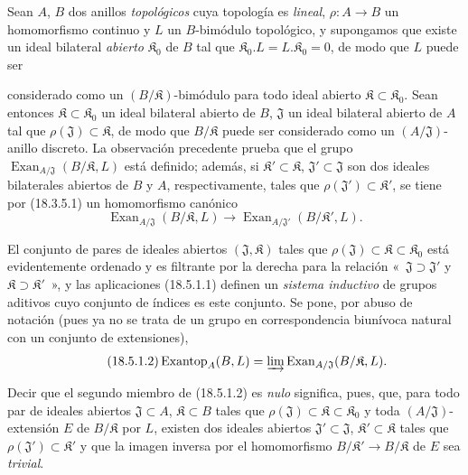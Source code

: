 \begin{env}[18.5.1]
\label{0.18.5.1-es}
Sean $A$, $B$ dos anillos \emph{topológicos} cuya topología es \emph{lineal},
$\rho:A\to B$ un homomorfismo continuo y $L$ un $B$-bimódulo topológico, y
supongamos que existe un ideal bilateral \emph{abierto} $\mathfrak K_0$ de $B$
tal que $\mathfrak K_0.L=L.\mathfrak K_0=0$, de modo que $L$ puede ser


considerado como un $(B/\mathfrak K)$-bimódulo para todo ideal abierto
$\mathfrak K\subset\mathfrak K_0$. Sean entonces
$\mathfrak K\subset\mathfrak K_0$ un ideal bilateral abierto de $B$,
$\mathfrak J$ un ideal bilateral abierto de $A$ tal que
$\rho(\mathfrak J)\subset\mathfrak K$, de modo que $B/\mathfrak K$ puede ser
considerado como un $(A/\mathfrak J)$-anillo discreto. La observación
precedente prueba que el grupo
$\operatorname{Exan}_{A/\mathfrak J}(B/\mathfrak K,L)$ está definido; además,
si $\mathfrak K'\subset\mathfrak K$, $\mathfrak J'\subset\mathfrak J$ son dos
ideales bilaterales abiertos de $B$ y $A$, respectivamente, tales que
$\rho(\mathfrak J')\subset\mathfrak K'$, se tiene por (18.3.5.1) un
homomorfismo canónico
\begin{equation}
\label{0.18.5.1.1-es}
\tag{18.5.1.1}
  \operatorname{Exan}_{A/\mathfrak J}(B/\mathfrak K,L)
  \longrightarrow
  \operatorname{Exan}_{A/\mathfrak J'}(B/\mathfrak K',L).
\end{equation}

El conjunto de pares de ideales abiertos $(\mathfrak J,\mathfrak K)$ tales que
$\rho(\mathfrak J)\subset\mathfrak K\subset\mathfrak K_0$ está evidentemente
ordenado y es filtrante por la derecha para la relación «~$\mathfrak J\supset\mathfrak J'$
y $\mathfrak K\supset\mathfrak K'$~», y las aplicaciones (18.5.1.1)
definen un \emph{sistema inductivo} de grupos aditivos cuyo conjunto
de índices es este conjunto. Se pone, por abuso de notación (pues ya no se trata
de un grupo en correspondencia biunívoca natural con un conjunto
de extensiones),
\begin{equation}
\label{0.18.5.1.2-es}
\tag{18.5.1.2}
  \operatorname{Exantop}_A(B,L)
  =\varinjlim\operatorname{Exan}_{A/\mathfrak J}(B/\mathfrak K,L).
\end{equation}

Decir que el segundo miembro de (18.5.1.2) es \emph{nulo} significa, pues, que, para
todo par de ideales abiertos $\mathfrak J\subset A$, $\mathfrak K\subset B$
tales que $\rho(\mathfrak J)\subset\mathfrak K\subset\mathfrak K_0$ y toda
$(A/\mathfrak J)$-extensión $E$ de $B/\mathfrak K$ por $L$, existen dos
ideales abiertos $\mathfrak J'\subset\mathfrak J$,
$\mathfrak K'\subset\mathfrak K$ tales que
$\rho(\mathfrak J')\subset\mathfrak K'$ y que la imagen inversa por
el homomorfismo $B/\mathfrak K'\to B/\mathfrak K$ de $E$ sea \emph{trivial}.


\end{env}
